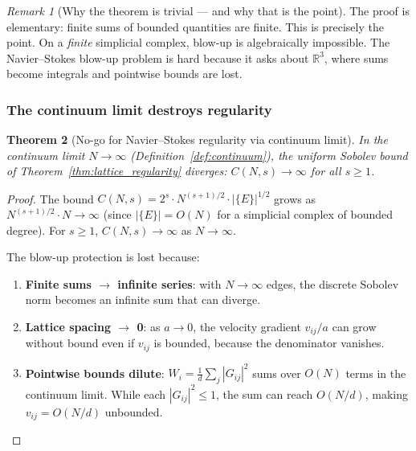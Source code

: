 \documentclass[12pt]{article}
\newtheorem{theorem}{Theorem}[section]
\theoremstyle{remark}
\newtheorem{remark}[theorem]{Remark}
\theoremstyle{definition}
\newcommand{\RR}{\mathbb{R}}
\begin{document}
\begin{remark}[Why the theorem is trivial --- and why that is the point]
The proof is elementary: finite sums of bounded quantities are finite.
This is precisely the point.  On a \emph{finite} simplicial complex,
blow-up is algebraically impossible.  The Navier--Stokes blow-up
problem is hard because it asks about $\RR^3$, where sums become
integrals and pointwise bounds are lost.
\end{remark}

\subsubsection{The continuum limit destroys regularity}

\begin{theorem}[No-go for Navier--Stokes regularity via continuum limit]
\label{thm:ns_nogo}
In the continuum limit $N \to \infty$ (Definition~\ref{def:continuum}),
the uniform Sobolev bound of Theorem~\ref{thm:lattice_regularity}
diverges: $C(N, s) \to \infty$ for all $s \geq 1$.
\end{theorem}

\begin{proof}
The bound $C(N, s) = 2^s \cdot N^{(s+1)/2} \cdot |\{E\}|^{1/2}$
grows as $N^{(s+1)/2} \cdot N \to \infty$ (since
$|\{E\}| = O(N)$ for a simplicial complex of bounded degree).
For $s \geq 1$, $C(N,s) \to \infty$ as $N \to \infty$.

The blow-up protection is lost because:
\begin{enumerate}
\item \textbf{Finite sums $\to$ infinite series}: with $N \to \infty$
  edges, the discrete Sobolev norm becomes an infinite sum that
  can diverge.
\item \textbf{Lattice spacing $\to$ 0}: as $a \to 0$, the velocity
  gradient $v_{ij}/a$ can grow without bound even if $v_{ij}$ is
  bounded, because the denominator vanishes.
\item \textbf{Pointwise bounds dilute}: $W_i = \frac{1}{d}\sum_j
  |G_{ij}|^2$ sums over $O(N)$ terms in the continuum limit.
  While each $|G_{ij}|^2 \leq 1$, the sum can reach $O(N/d)$,
  making $v_{ij} = O(N/d)$ unbounded.
\end{enumerate}
\end{proof}
\end{document}
